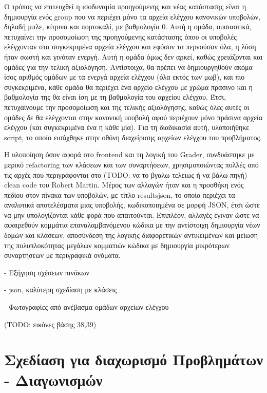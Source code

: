 \documentclass[diploma]{softlab-thesis}
\begin{document}
Ο τρόπος να επιτευχθεί η ισοδυναμία προηγούμενης και νέας κατάστασης είναι η
δημιουργία ενός group που να περιέχει μόνο τα αρχεία ελέγχου κανονικών
υποβολών, δηλαδή μπλε, κίτρινα και πορτοκαλί, με βαθμολογία 0. Αυτή η ομάδα,
ουσιαστικά, πετυχαίνει την προσομοίωση της προηγούμενης κατάστασης όπου οι
υποβολές ελέγχονταν στα συγκεκριμένα αρχεία ελέγχου και εφόσον τα περνούσαν
όλα, η λύση ήταν σωστή και γινόταν ενεργή. Αυτή η ομάδα όμως δεν αρκεί, καθώς
χρειάζονται και ομάδες για την τελική αξιολόγηση. Αντίστοιχα, θα πρέπει να
δημιουργηθούν ακόμα ίσος αριθμός ομάδων με τα ενεργά αρχεία ελέγχου (όλα εκτός
των μωβ), και πιο συγκεκριμένα, κάθε ομάδα θα περιέχει ένα αρχείο ελέγχου με
χρώμα πράσινο και η βαθμολογία της θα είναι ίση με τη βαθμολογία του αρχείου
ελέγχου. Έτσι, πετυχαίνουμε την προσομοίωση και της τελικής αξιολόγησης, καθώς
όλες αυτές οι ομάδες δε θα ελέγχονται στην κανονική υποβολή αφού περιέχουν μόνο
πράσινα αρχεία ελέγχου (και συγκεκριμένα ένα η κάθε μία). Για τη διαδικασία
αυτή, υλοποιήθηκε script, το οποίο εισάχθηκε στην οθόνη διαχείρισης αρχείων
ελέγχου του προβλήματος.

\bigskip

Η υλοποίηση όσον αφορά στο frontend και τη λογική του Grader, συνδυάστηκε με
μερικό refactoring των κλάσεων και των συναρτήσεων, χρησιμοποιώντας πολλές
από τις αρχές που περιγράφονται στο (TODO: να το βγαλω τελειως ή να βάλω πηγή)
clean code του Robert Martin. Μέρος των αλλαγών ήταν και η προσθήκη ενός πεδίου
στον πίνακα των υποβολών, με τίτλο resultsjson, το οποίο περιέχει τα αναλυτικά
αποτελέσματα μιας υποβολής, κωδικοποιημένα σε μορφή JSON, έτσι ώστε να μην
υπολογίζονται κάθε φορά που απαιτούνται. Επιπλέον, αλλαγές έγιναν ώστε να
αφαιρεθούν κομμάτια επαναλαμβανόμενου κώδικα με την αντίστοιχη δημιουργία
νέων δομών και κλάσεων, αποσύνδεση της λογικής διαφορετικών αντικειμένων και
μείωση της πολυπλοκότητας μεγάλων κομματιών κώδικα με δημιουργία μικρότερων
συναρτήσεων με περιγραφικά ονόματα.

\bigskip

- Εξήγηση σχέσεων πινάκων

- json, καλύτερη σχεδίαση με κλάσεις

- Φωτογραφίες από ανέβασμα ομάδων αρχείων ελέγχου

\bigskip

(TODO: εικόνες βάσης 38,39)


\chapter{Σχεδίαση για διαχωρισμό Προβλημάτων - Διαγωνισμών}
\end{document}
